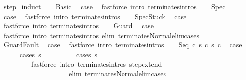 \begin{isabellebody}
%
\isadelimproof
%
\endisadelimproof
%
\isatagproof
{}\isamarkupfalse%
\ step\isanewline
{}\isamarkupfalse%
\ {\isacharparenleft}induct{\isacharparenright}\isanewline
\ \ \isamarkupfalse%
\ Basic\ \isamarkupfalse%
\ {\isacharquery}case\ \isamarkupfalse%
\ {\isacharparenleft}fastforce\ intro{\isacharcolon}\ terminates{\isachardot}intros{\isacharparenright}\isanewline
{}\isamarkupfalse%
\isanewline
\ \ \isamarkupfalse%
\ Spec\ \isamarkupfalse%
\ {\isacharquery}case\ \isamarkupfalse%
\ {\isacharparenleft}fastforce\ intro{\isacharcolon}\ terminates{\isachardot}intros{\isacharparenright}\isanewline
{}\isamarkupfalse%
\isanewline
\ \ \isamarkupfalse%
\ SpecStuck\ \isamarkupfalse%
\ {\isacharquery}case\ \isamarkupfalse%
\ {\isacharparenleft}fastforce\ intro{\isacharcolon}\ terminates{\isachardot}intros{\isacharparenright}\isanewline
{}\isamarkupfalse%
\isanewline
\ \ \isamarkupfalse%
\ Guard\ \isamarkupfalse%
\ {\isacharquery}case\ \isanewline
\ \ \ \ \isamarkupfalse%
\ {\isacharparenleft}fastforce\ intro{\isacharcolon}\ terminates{\isachardot}intros\ elim{\isacharcolon}\ terminates{\isacharunderscore}Normal{\isacharunderscore}elim{\isacharunderscore}cases{\isacharparenright}\isanewline
{}\isamarkupfalse%
\isanewline
\ \ \isamarkupfalse%
\ GuardFault\ \isamarkupfalse%
\ {\isacharquery}case\ \isamarkupfalse%
\ {\isacharparenleft}fastforce\ intro{\isacharcolon}\ terminates{\isachardot}intros{\isacharparenright}\isanewline
{}\isamarkupfalse%
\isanewline
\ \ \isamarkupfalse%
\ {\isacharparenleft}Seq\ c\ s\ c\ s{\isacharprime}\ c\ \isamarkupfalse%
\ {\isacharquery}case\isanewline
\ \ \ \ \isamarkupfalse%
\ {\isacharparenleft}cases\ s{\isacharparenright}\isanewline
\ \ \ \ \isamarkupfalse%
\ \ \ \ \ {\isacharparenleft}cases\ s{\isacharprime}{\isacharparenright}\isanewline
\ \ \ \ \isamarkupfalse%
\ \ \ \ \ \ \ \ \ {\isacharparenleft}fastforce\ intro{\isacharcolon}\ terminates{\isachardot}intros\ step{\isacharunderscore}extend\ \isanewline
\ \ \ \ \ \ \ \ \ \ \ \ \ \ \ \ \ \ \ \ elim{\isacharcolon}\ terminates{\isacharunderscore}Normal{\isacharunderscore}elim{\isacharunderscore}cases{\isacharparenright}\isanewline

\end{isabellebody}
